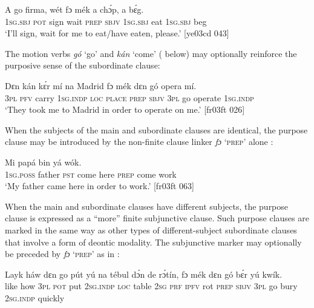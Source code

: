 \ea%
    \label{ex:key:1492}
    \gll A    go  firma,  wét    fɔ  mék    a    chɔ́p,  a    bɛ́g.\\
\textsc{1sg.sbj}  \textsc{pot}  sign    wait    \textsc{prep}  \textsc{sbjv}    \textsc{1sg.sbj}  eat    \textsc{1sg.sbj}  beg\\

\glt ‘I’ll sign, wait for me to eat/have eaten, please.’ [ye03cd 043]
\z

The motion verbs \textit{gó} ‘go’  and \textit{kán} ‘come’ ( below) may optionally reinforce the purposive sense of the subordinate clause: 


\ea%
    \label{ex:key:1493}
    \gll Dɛn  kán  kɛ́r    mí    na  Madrid  fɔ  mék    dɛn  gó  opera  mí.\\
\textsc{3pl}  \textsc{pfv}  carry  \textsc{1sg.indp}  \textsc{loc}  \textsc{place}  \textsc{prep}  \textsc{sbjv}    \textsc{3pl}  go  operate  \textsc{1sg.indp}\\

\glt ‘They took me to Madrid in order to operate on me.’ [fr03ft 026]
\z

When the subjects of the main and subordinate clauses are identical, the purpose clause may be introduced by the non-finite clause linker \textit{fɔ} ‘\textsc{prep}’ alone :


\ea%
    \label{ex:key:1494}
    \gll Mi    papá  bin      yá          wók.\\
\textsc{1sg.poss}  father  \textsc{pst}  come  here    \textsc{prep}  come  work\\

\glt ‘My father came here in order to work.’ [fr03ft 063]
\z

When the main and subordinate clauses have different subjects, the purpose clause is expressed as a “more” finite subjunctive clause. Such purpose clauses are marked in the same way as other types of different-subject subordinate clauses that involve a form of deontic modality. The subjunctive marker may optionally be preceded by \textit{fɔ} ‘\textsc{prep}’ as in :


\ea%
    \label{ex:key:1495}
    \gll Layk  háw    dɛn    go  pút  yú    na  tébul    dɔ́n  de  rɔ́tín,
fɔ  mék    dɛn  gó  bɛ́r    yú    kwík.\\
like    how    \textsc{3pl}    \textsc{pot}  put  \textsc{2sg.indp}  \textsc{loc}  table  \textsc{2sg}  \textsc{prf}  \textsc{ipfv}  rot
\textsc{prep}  \textsc{sbjv}    \textsc{3pl}  go  bury  \textsc{2sg.indp}  quickly\\

